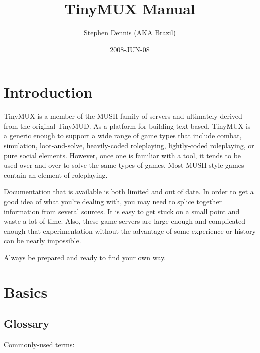 \documentclass[10pt,letterpaper]{book}
\title{TinyMUX Manual}
\author{Stephen Dennis (AKA Brazil)}
\date{2008-JUN-08}
\begin{document}
\frontmatter
\maketitle
\tableofcontents

\mainmatter
\chapter{Introduction}
TinyMUX is a member of the MUSH family of servers and ultimately
derived from the original TinyMUD.
As a platform for building text-based, TinyMUX is a generic enough to support
a wide range of game types that include combat, simulation, loot-and-solve,
heavily-coded roleplaying, lightly-coded roleplaying, or pure social elements.
However, once one is familiar with a tool, it tends to be used over and over
to solve the same types of games.
Most MUSH-style games contain an element of roleplaying.

Documentation that is available is both limited and out of date. In order to
get a good idea of what you're dealing with, you may need to splice together
information from several sources. It is easy to get stuck on a small point
and waste a lot of time.  Also, these game servers are large enough and
complicated enough that experimentation without the advantage of some
experience or history can be nearly impossible.

Always be prepared and ready to find your own way.

\chapter{Basics}
\section{Glossary}

Commonly-used terms:
\end{document}
